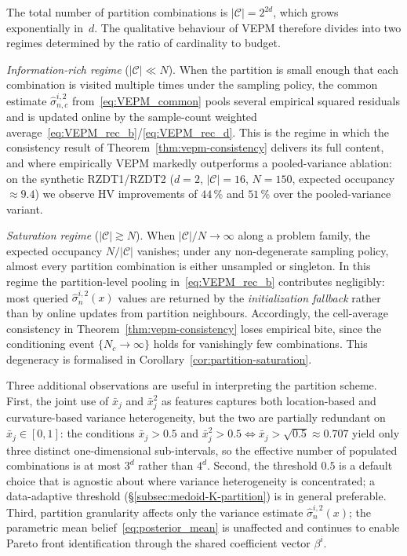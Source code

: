 \begin{remark}
  \label{rem:partition}
  The total number of partition combinations is $|\mathcal{C}| = 2^{2d}$,
  which grows exponentially in~$d$.  The qualitative behaviour of VEPM
  therefore divides into two regimes determined by the ratio of
  cardinality to budget.

  \emph{Information-rich regime} ($|\mathcal{C}| \ll N$).  When the
  partition is small enough that each combination is visited multiple
  times under the sampling policy, the common estimate
  $\hat{\sigma}^{i,2}_{n,c}$ from~\eqref{eq:VEPM_common} pools several
  empirical squared residuals and is updated online by the sample-count
  weighted average~\eqref{eq:VEPM_rec_b}/\eqref{eq:VEPM_rec_d}.  This is
  the regime in which the consistency
  result of Theorem~\ref{thm:vepm-consistency} delivers its full content,
  and where empirically VEPM markedly outperforms a pooled-variance
  ablation: on the synthetic RZDT1/RZDT2 ($d=2$, $|\mathcal{C}|=16$,
  $N=150$, expected occupancy $\approx9.4$) we observe HV improvements of
  $44$\,\% and $51$\,\% over the pooled-variance variant.

  \emph{Saturation regime} ($|\mathcal{C}| \gtrsim N$).  When
  $|\mathcal{C}|/N \to \infty$ along a problem family, the expected
  occupancy $N/|\mathcal{C}|$ vanishes; under any non-degenerate sampling
  policy, almost every partition combination is either unsampled or
  singleton.  In this regime the partition-level pooling
  in~\eqref{eq:VEPM_rec_b} contributes negligibly: most queried
  $\hat{\sigma}^{i,2}_n(x)$ values are returned by the
  \emph{initialization fallback} rather than by online updates from
  partition neighbours.  Accordingly, the cell-average
  consistency in Theorem~\ref{thm:vepm-consistency} loses
  empirical bite, since the conditioning event $\{N_{c}\to\infty\}$ holds
  for vanishingly few combinations.  This degeneracy is formalised in
  Corollary~\ref{cor:partition-saturation}.

  Three additional observations are useful in interpreting the partition
  scheme.  First, the joint use of $\bar{x}_j$ and $\bar{x}_j^{2}$ as
  features captures both location-based and curvature-based variance
  heterogeneity, but the two are partially redundant on
  $\bar{x}_j\in[0,1]$: the conditions $\bar{x}_j>0.5$ and
  $\bar{x}_j^{2}>0.5\Leftrightarrow\bar{x}_j>\sqrt{0.5}\approx0.707$
  yield only three distinct one-dimensional sub-intervals, so the
  effective number of populated combinations is at most $3^{d}$ rather
  than $4^{d}$.  Second, the threshold $0.5$ is a default choice that is
  agnostic about where variance heterogeneity is concentrated; a
  data-adaptive threshold (\S\ref{subsec:medoid-K-partition}) is in
  general preferable.  Third, partition granularity affects only the
  variance estimate $\hat{\sigma}^{i,2}_n(x)$; the parametric mean
  belief~\eqref{eq:posterior_mean} is unaffected and continues to
  enable Pareto front identification through the shared coefficient
  vector $\beta^{i}$.


\end{remark}
